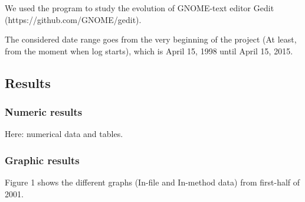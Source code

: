 \documentclass[a4paper]{article}
\begin{document}
We used the program to study the evolution of GNOME-text editor Gedit (https://github.com/GNOME/gedit).

The considered date range goes from the very beginning of the project (At
least, from the moment when log starts), which is April 15, 1998 until April
15, 2015.

\subsection{Results}

\subsubsection{Numeric results}

Here: numerical data and tables.

\subsubsection{Graphic results}

Figure 1 shows the different graphs (In-file and In-method data) from
first-half of 2001.
\end{document}
